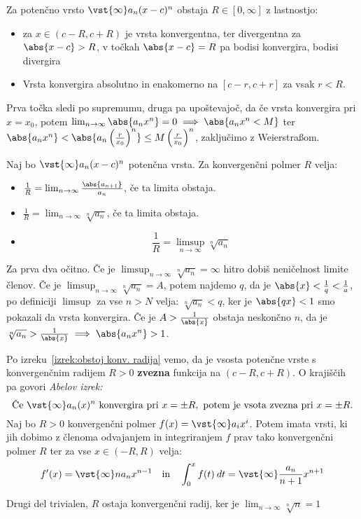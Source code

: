 \documentclass[12pt, a4paper, unicode]{article}
\begin{document}
\begin{izrek}
Za potenčno vrsto $\vst{\infty} a_n(x-c)^n$ obstaja $R \in [0, \infty]$ z lastnostjo: \begin{itemize}
    \item za $x \in (c-R,c+R)$ je vrsta konvergentna, ter divergentna za  $\abs{x-c} > R$, v točkah $\abs{x-c} = R$ pa bodisi konvergira, bodisi divergira
    \item Vrsta konvergira absolutno in enakomerno na $[c-r, c+r]$ za vsak $r < R$.
\end{itemize}
\end{izrek}
\begin{oris}
Prva točka sledi po supremumu, druga pa upoštevajoč, da če vrsta konvergira pri $x = x_0$, potem $\lim_{n \to \infty} \abs{a_n x^n} = 0 \implies \abs{a_n x^n < M}$ ter $\abs{a_n x^n} < \abs{a_n \left(\frac{r}{x_0}\right)^n} \leq M \left( \frac{r}{x_0} \right)^n$, zaključimo z Weierstraßom.
\end{oris}
\begin{izrek}
Naj bo $\vst{\infty} a_n (x-c)^n$ potenčna vrsta. Za konvergenčni polmer $R$ velja:
\begin{itemize}
    \item $\frac{1}{R} = \lim_{n \to \infty} \frac{\abs{a_{n+1}}}{a_n}$, če ta limita obstaja.
    \item $\frac{1}{R} = \lim_{n \to \infty} \sqrt[n]{a_n}$, če ta limita obstaja.
    \item $$\frac{1}{R} = \limsup_{n \to \infty} \sqrt[n]{a_n}$$
\end{itemize}
\end{izrek}
\begin{oris}
Za prva dva očitno. Če je $\limsup_{n \to \infty} \sqrt[n]{a_n} = \infty$ hitro dobiš neničelnost limite členov. Če je $\limsup_{n \to \infty} \sqrt[n]{a_n} = A$, potem najdemo $q$, da je $\abs{x} < \frac{1}{q} < \frac{1}{a}$, po definiciji $\limsup$ za vse $n > N$ velja: $\sqrt[n]{a_n} < q$, ker je $\abs{qx} < 1$ smo pokazali da vrsta konvergira. Če je $A > \frac{1}{\abs{x}}$ obstaja neskončno $n$, da je $\sqrt[n]{a_n} > \frac{1}{\abs{x}} \implies \abs{a_n x^n} > 1$.
\end{oris}

\begin{izrek}
Po izreku~\ref{izrek:obstoj konv. radija} vemo, da je vsosta potenčne vrste s konvergenčnim radijem $R > 0$ \textbf{zvezna} funkcija na $(c-R, c+R)$. O krajiščih pa govori \textit{Abelov izrek:}
\[
\text{Če } \vst{\infty} a_n(x)^n \text{ konvergira pri }x = \pm R,\text{ potem je vsota zvezna pri }x = \pm R.
\]
Naj bo $R > 0$ konvergenčni polmer $f(x) = \vst{\infty}a_i x^i$. Potem imata vrsti, ki jih dobimo z členoma odvajanjem in integriranjem $f$ prav tako konvergenčni polmer $R$ ter za vse $x \in (-R,R)$ velja: $$f'(x) = \vst{\infty} n a_n x^{n-1} \quad \text{in} \quad \int_{0}^{x}f(t) \: dt = \vst{\infty} \frac{a_n}{n+1}x^{n+1}$$
\end{izrek}
\begin{oris}
Drugi del trivialen, $R$ ostaja konvergenčni radij, ker je $\lim_{n \to \infty} \sqrt[n]{n} = 1$
\end{oris}
\end{document}
